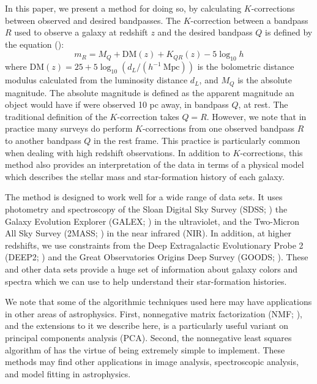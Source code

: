 \documentclass[10pt,preprint]{aastex}
\begin{document}
In this paper, we present a method for doing so, by calculating
$K$-corrections between observed and desired bandpasses.  The
$K$-correction between a bandpass $R$ used to observe a galaxy at
redshift $z$ and the desired bandpass $Q$ is defined by the equation
(\citealt{oke68a, hogg02a}):
\begin{equation}
m_R = M_Q + \mathrm{DM}(z) + K_{QR}(z) - 5 \log_{10} h 
\end{equation}
where $\mathrm{DM}(z) = 25 + 5\log_{10} (d_L / (h^{-1}{\mathrm{~Mpc}}))$ is the
bolometric distance modulus calculated from the luminosity distance
$d_L$, and $M_Q$ is the absolute magnitude. The absolute magnitude is
defined as the apparent magnitude an object would have if were
observed 10 pc away, in bandpass $Q$, at rest.  The traditional
definition of the $K$-correction takes $Q=R$. However, we note that in
practice many surveys do perform $K$-corrections from one observed
bandpass $R$ to another bandpass $Q$ in the rest frame. This practice
is particularly common when dealing with high redshift observations.
In addition to $K$-corrections, this method also provides an
interpretation of the data in terms of a physical model which
describes the stellar mass and star-formation history of each galaxy.

The method is designed to work well for a wide range of data sets.  It
uses photometry and spectroscopy of the Sloan Digital Sky Survey
(SDSS; \citealt{york00a}) the Galaxy Evolution Explorer (GALEX;
\citealt{martin05a}) in the ultraviolet, and the Two-Micron All Sky
Survey (2MASS; \citealt{skrutskie97a}) in the near infrared (NIR). In
addition, at higher redshifts, we use constraints from the Deep
Extragalactic Evolutionary Probe 2 (DEEP2; \citealt{davis03a,
faber03a}) and the Great Observatories Origins Deep Survey (GOODS;
\citealt{giavalisco04a}).  These and other data sets provide a huge
set of information about galaxy colors and spectra which we can use to
help understand their star-formation histories.

We note that some of the algorithmic techniques used here may have
applications in other areas of astrophysics. First, nonnegative matrix
factorization (NMF; \citealt{lee00a}), and the extensions to it we
describe here, is a particularly useful variant on principal
components
analysis (PCA). Second, the nonnegative least squares algorithm of
\citet{sha02a} has the virtue of being extremely simple to implement.
These methods may find other applications in image analysis, spectroscopic
analysis, and model fitting in astrophysics.
\end{document}
